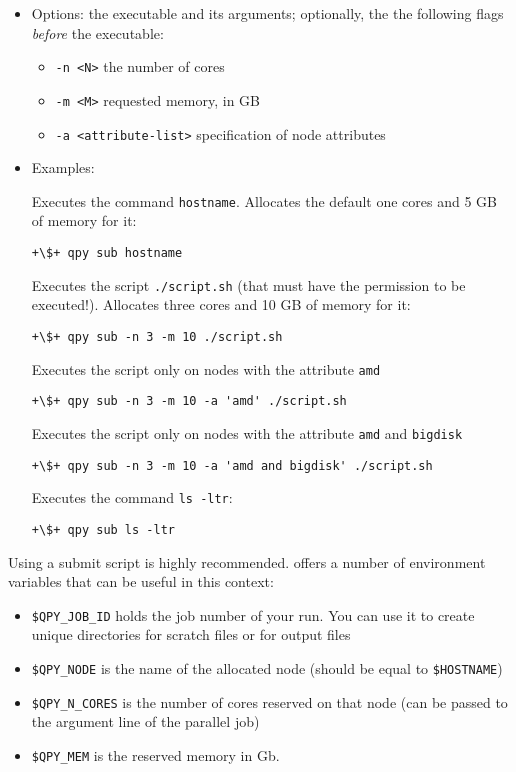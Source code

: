 \documentclass[a4paper,12pt]{article}
\begin{document}
\begin{itemize}
\item Options:
  the executable and its arguments;
  optionally, the the following flags \emph{before} the executable:
  \begin{itemize}
  \item \texttt{-n <N>} \quad   the number of cores
  \item \texttt{-m <M>} \quad   requested memory, in GB
  \item \texttt{-a <attribute-list>} \quad specification of node attributes 
  \end{itemize}
  
\item Examples:

  Executes the command \texttt{hostname}. Allocates the default one cores and 5 GB of memory for it:

\begin{lstlisting}[style=BashStyle]
+\$+ qpy sub hostname
\end{lstlisting}
  
  Executes the script \texttt{./script.sh} (that must have the permission to be executed!). Allocates three cores and 10 GB of memory for it:

\begin{lstlisting}[style=BashStyle]
+\$+ qpy sub -n 3 -m 10 ./script.sh 
\end{lstlisting}

Executes the script only on nodes with the attribute \texttt{amd}
\begin{lstlisting}[style=BashStyle]
+\$+ qpy sub -n 3 -m 10 -a 'amd' ./script.sh 
\end{lstlisting}

Executes the script only on nodes with the attribute \texttt{amd} and \texttt{bigdisk}
\begin{lstlisting}[style=BashStyle]
+\$+ qpy sub -n 3 -m 10 -a 'amd and bigdisk' ./script.sh 
\end{lstlisting}

  Executes the command \texttt{ls -ltr}:

\begin{lstlisting}[style=BashStyle]
+\$+ qpy sub ls -ltr
\end{lstlisting}



\end{itemize}
  
Using a submit script is highly recommended. \qpy{} offers a number of environment variables that can be useful in this context: 
\begin{itemize}
\item \verb+$QPY_JOB_ID+ holds the job number of your run. You can use it to create unique directories for scratch files or for output files
\item \verb+$QPY_NODE+ is the name of the allocated node (should be equal to \verb+$HOSTNAME+)
\item \verb+$QPY_N_CORES+ is the number of cores reserved on that node (can be passed to the argument line of the parallel job)
\item \verb+$QPY_MEM+ is the reserved memory in Gb.
\end{itemize}
\end{document}
